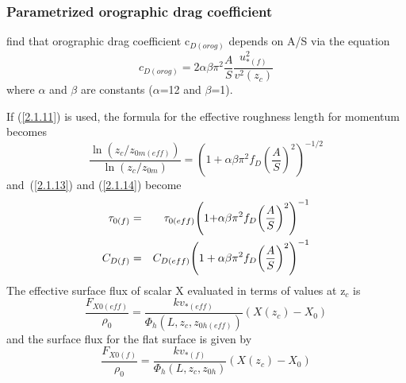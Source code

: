 \documentclass{UMDP_article}
\begin{document}
\subsubsection{Parametrized orographic drag coefficient}

\cite{wood93} find that orographic drag coefficient c$_{D(orog)}$
depends on A/S via the equation
\begin{equation}
  c_{D(orog)} = 2\alpha \beta  \pi ^2 \frac{A}{S} \frac{ u_{\ast (f)}^2 }{ v^2 ( z_c )}
  \label{2.1.11}
\end{equation}
where $\alpha $ and $\beta $ are constants ($\alpha $=12 and $\beta $=1).

If (\ref{2.1.11}) is used, the formula for the effective roughness length 
for momentum becomes
\begin{equation}
  \frac{\ln (  z_c /  z_{0m(eff)} )}{\ln (  z_c /  z_{0m} )} =  {\left( {1 + \alpha \beta  \pi ^2  f_D  {\left( {\frac{A}{S}} \right)}^2 } \right)}^{-1/2}
  \label{2.1.15}
\end{equation}
and~(\ref{2.1.13}) and (\ref{2.1.14}) become
\begin{eqnarray}
  {\rm {\bf \tau }}_{{0(f)}} &=& {\rm {\bf \tau
    }}_{{0(eff)}} {\left( {{1 + }\alpha \beta \pi ^{2} { } {f}_{D} { }
        {\left( {\frac{{A}}{{S}}} \right)}^{2} { }} \right)}^{-1}
  \label{2.1.16} \\
  C_{D(f)}&= &C_{D(eff)}  {\left( {1 + \alpha \beta  \pi ^2  f_D  {\left( {\frac{A}{S}} \right)}^2 } \right)}^{-1}
  \label{2.1.17}
\end{eqnarray}
The effective surface flux of scalar X evaluated in terms of values at
z$_{c}$ is
\begin{equation}
  \frac{ F_{X0(eff)} }{ \rho _0 } = \frac{k  v_{\ast (eff)} }{ \Phi _h (L ,  z_c ,  z_{0h(eff)} )} (X( z_c ) -  X_0 )
  \label{2.1.18}
\end{equation}
and the surface flux for the flat surface is given by
\begin{equation}
  \frac{ F_{X0(f)} }{ \rho _0 } = \frac{k  v_{\ast (f)} }{ \Phi _h (L ,  z_c ,  z_{0h} )} (X( z_c ) -  X_0 )
  \label{2.1.19}
\end{equation}
\end{document}
